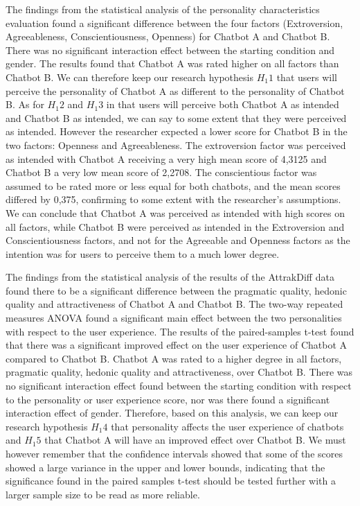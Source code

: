 The findings from the statistical analysis of the personality characteristics evaluation found a significant difference between the four factors (Extroversion, Agreeableness, Conscientiousness, Openness) for Chatbot A and Chatbot B. There was no significant interaction effect between the starting condition and gender. The results found that Chatbot A was rated higher on all factors than Chatbot B. We can therefore keep our research hypothesis $H_1 1$ that users will perceive the personality of Chatbot A as different to the personality of Chatbot B. As for $H_1 2$ and $H_1 3$ in that users will perceive both Chatbot A as intended and Chatbot B as intended, we can say to some extent that they were perceived as intended. However the researcher expected a lower score for Chatbot B in the two factors: Openness and Agreeableness. The extroversion factor was perceived as intended with Chatbot A receiving a very high mean score of 4,3125 and Chatbot B a very low mean score of 2,2708. The conscientious factor was assumed to be rated more or less equal for both chatbots, and the mean scores differed by 0,375, confirming to some extent with the researcher's assumptions. We can conclude that Chatbot A was perceived as intended with high scores on all factors, while Chatbot B were perceived as intended in the Extroversion and Conscientiousness factors, and not for the Agreeable and Openness factors as the intention was for users to perceive them to a much lower degree. 

The findings from the statistical analysis of the results of the AttrakDiff data found there to be a significant difference between the pragmatic quality, hedonic quality and attractiveness of Chatbot A and Chatbot B. The two-way repeated measures ANOVA found a significant main effect between the two personalities with respect to the user experience. The results of the paired-samples t-test found that there was a significant improved effect on the user experience of Chatbot A compared to Chatbot B. Chatbot A was rated to a higher degree in all factors, pragmatic quality, hedonic quality and attractiveness, over Chatbot B. There was no significant interaction effect found between the starting condition with respect to the personality or user experience score, nor was there found a significant interaction effect of gender. Therefore, based on this analysis, we can keep our research hypothesis $H_1 4$ that personality affects the user experience of chatbots and $H_1 5$ that Chatbot A will have an improved effect over Chatbot B. We must however remember that the confidence intervals showed that some of the scores showed a large variance in the upper and lower bounds, indicating that the significance found in the paired samples t-test should be tested further with a larger sample size to be read as more reliable.

